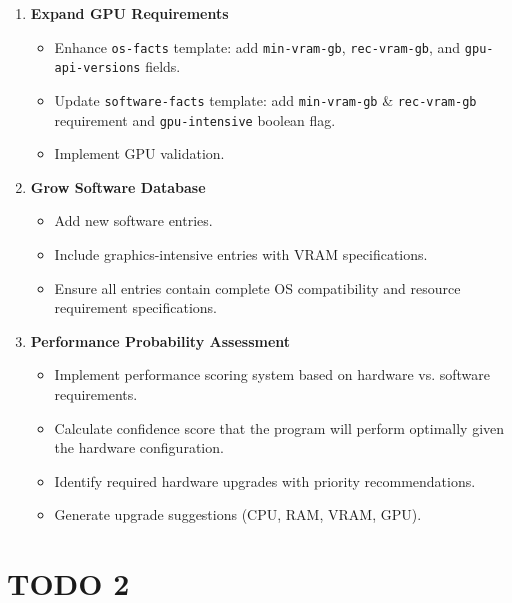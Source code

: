 \documentclass{article}
\begin{document}
\begin{enumerate}
    \item \textbf{Expand GPU Requirements}
          \begin{itemize}
              \item Enhance \texttt{os-facts} template: add \texttt{min-vram-gb}, \texttt{rec-vram-gb}, and \texttt{gpu-api-versions} fields.
              \item Update \texttt{software-facts} template: add \texttt{min-vram-gb} \& \texttt{rec-vram-gb} requirement and \texttt{gpu-intensive} boolean flag.
              \item Implement GPU validation.
          \end{itemize}

    \item \textbf{Grow Software Database}
          \begin{itemize}
              \item Add new software entries.
              \item Include graphics-intensive entries with VRAM specifications.
              \item Ensure all entries contain complete OS compatibility and resource requirement specifications.
          \end{itemize}

    \item \textbf{Performance Probability Assessment}
          \begin{itemize}
              \item Implement performance scoring system based on hardware vs. software requirements.
              \item Calculate confidence score that the program will perform optimally given the hardware configuration.
              \item Identify required hardware upgrades with priority recommendations.
              \item Generate upgrade suggestions (CPU, RAM, VRAM, GPU).
          \end{itemize}
\end{enumerate}


\section*{TODO 2}
\end{document}

